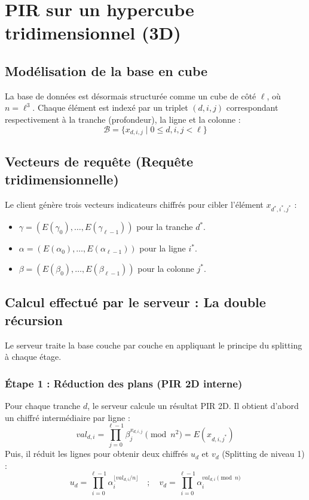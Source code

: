 \documentclass[12pt,a4paper]{report}
\begin{document}

\section{PIR sur un hypercube tridimensionnel (3D)}

\subsection{Modélisation de la base en cube}
La base de données est désormais structurée comme un cube de côté $\ell$, où $n = \ell^3$. Chaque élément est indexé par un triplet $(d, i, j)$ correspondant respectivement à la tranche (profondeur), la ligne et la colonne :
\[ \mathcal{B} = \{x_{d,i,j} \mid 0 \le d,i,j < \ell\} \]

\subsection{Vecteurs de requête (Requête tridimensionnelle)}
Le client génère trois vecteurs indicateurs chiffrés pour cibler l'élément $x_{d^*, i^*, j^*}$ :
\begin{itemize}
    \item $\gamma = (E(\gamma_0), \dots, E(\gamma_{\ell-1}))$ pour la tranche $d^*$.
    \item $\alpha = (E(\alpha_0), \dots, E(\alpha_{\ell-1}))$ pour la ligne $i^*$.
    \item $\beta = (E(\beta_0), \dots, E(\beta_{\ell-1}))$ pour la colonne $j^*$.
\end{itemize}

\subsection{Calcul effectué par le serveur : La double récursion}
Le serveur traite la base couche par couche en appliquant le principe du splitting à chaque étage.

\subsubsection{Étape 1 : Réduction des plans (PIR 2D interne)}
Pour chaque tranche $d$, le serveur calcule un résultat PIR 2D. Il obtient d'abord un chiffré intermédiaire par ligne :
\[ val_{d,i} = \prod_{j=0}^{\ell-1} \beta_j^{x_{d,i,j}} \pmod{n^2} = E(x_{d,i,j^*}) \]
Puis, il réduit les lignes pour obtenir deux chiffrés $u_d$ et $v_d$ (Splitting de niveau 1) :
\[ u_d = \prod_{i=0}^{\ell-1} \alpha_i^{\lfloor val_{d,i} / n \rfloor} \quad ; \quad v_d = \prod_{i=0}^{\ell-1} \alpha_i^{val_{d,i} \pmod n} \]
\end{document}
